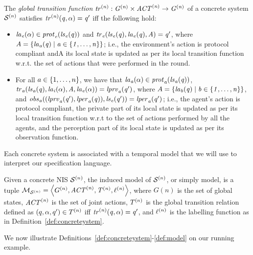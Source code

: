 \begin{definition} 
  \label{def:globaltransition}
  The {\em global transition function} $\it{tr}^{(n)} : G^{(n)}
  \times \it{ACT}^{(n)} \rightarrow G^{(n)}$ of a concrete system $\mathcal{S}^{(n)}$
  satisfies $\it{tr}^{(n)}(q, \alpha) = q'$ iff the following hold:
  \begin{itemize}
    \item $\it{la}_{e}({\alpha}) \in \it{prot}_{e}({\it{ls}_{e}(q)})$ and $\it{tr}_{e}(\it{ls}_{e}(q),
    \it{la}_{e}({q}), A) = q'$, where $A = \left \{ \it{la}_{a}({q}) \mid a \in
    \left \{ 1,\ldots,n \right \} \right \}$; i.e., the environment’s action is protocol compliant
    andA its local state is updated as per its local transition function w.r.t.
    the set of actions that were performed in the round. 

    \item For all $a \in \left \{ 1,\ldots,n \right \}$, we have that $\it{la}_{a}({\alpha}) \in
    \it{prot}_{a}(\it{ls}_{a}(q))$, $\it{tr}_{a} (\it{ls}_{a}(q), \it{la}_{i}({\alpha}), A, \it{la}_{e}({\alpha})) = \it{lprv}_{a}(q')$,
    where $A = \left \{ \it{la}_{b}({q}) \mid b \in \left \{ 1,\ldots,n \right \} \right \}$,
    and $\it{obs}_{a}((\it{lprv}_{a}(q'),\it{lper}_{a}(q)),\it{ls}_{e}(q')) = \it{lper}_{a}(q')$; i.e.,
    the agent's action is protocol compliant, the private part of its local
    state is updated as per its local transition function w.r.t to the set of
    actions performed by all the agents, and the perception part of its
    local state is updated as per its observation function.
  \end{itemize}
\end{definition}


Each concrete system is associated with a temporal model 
that we will use  to interpret our specification language.

\begin{definition}[Model]
  \label{def:model}
  Given a concrete NIS $\mathcal{S}^{(n)}$, the induced model of $\mathcal{S}^{(n)}$, or simply model,
  is a tuple $\mathcal{M}_{\mathcal{S}^{(n)}} = \left \langle G^{(n)}, \it{ACT}^{(n)}, T^{(n)},
  \ell^{(n)} \right \rangle$, where $G(n)$ is the set of global states, $\it{ACT}^{(n)}$ is the
  set of joint actions, $T^{(n)}$ is the global transition relation defined
  as $(q, \alpha, q') \in T^{(n)}$ iff $\it{tr}^{(n)}(q, \alpha) = q'$, and 
  $\ell^{(n)}$ is the labelling function as in
  Definition~\ref{def:concreteystem}.
\end{definition}

We now illustrate Definitions~\ref{def:concreteystem}-\ref{def:model} on our running
example.

